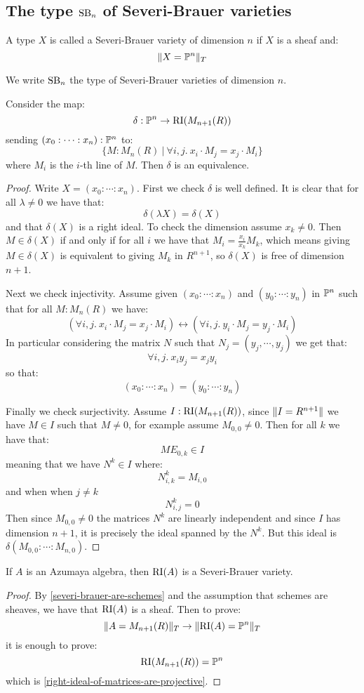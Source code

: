 \subsection{The type $\mathrm{SB}_n$ of Severi-Brauer varieties}

\begin{definition}
A type $X$ is called a Severi-Brauer variety of dimension $n$ if $X$ is a sheaf and:
\[\lVert X=\mathbb{P}^n \rVert_T\]
\end{definition}

We write $\mathrm{SB}_n$ the type of Severi-Brauer varieties of dimension $n$.

\begin{lemma}\label{right-ideal-of-matrices-are-projective}
Consider the map:
\[\delta:\mathbb{P}^n \to \mathrm{RI}(M_{n+1}(R))\]
sending $(x_0:\cdots:x_n):\mathbb{P}^n$ to:
\[\{M:M_n(R)\ |\ \forall i,j.\ x_i\cdot M_j = x_j\cdot M_i\}\]
where $M_i$ is the $i$-th line of $M$. Then $\delta$ is an equivalence.
\end{lemma}

\begin{proof}
Write $X=(x_0:\cdots:x_n)$. First we check $\delta$ is well defined. It is clear that for all $\lambda\not=0$ we have that:
\[\delta(\lambda X) = \delta(X)\]
and that $\delta(X)$ is a right ideal. To check the dimension assume $x_k\not=0$. Then $M\in\delta(X)$ if and only if for all $i$ we have that $M_i = \frac{x_i}{x_k} M_k$, which means giving $M\in\delta(X)$ is equivalent to giving $M_k$ in $R^{n+1}$, so $\delta(X)$ is free of dimension $n+1$.

Next we check injectivity. Assume given $(x_0:\cdots:x_n)$ and $(y_0:\cdots:y_n)$ in $\mathbb{P}^n$ such that for all $M:M_n(R)$ we have:
\[(\forall i,j.\ x_i\cdot M_j = x_j\cdot M_i) \leftrightarrow (\forall i,j.\ y_i\cdot M_j = y_j\cdot M_i)\]
In particular considering the matrix $N$ such that $N_j = (y_j,\cdots,y_j)$ we get that:
\[\forall i,j.\ x_iy_j=x_jy_i\] 
so that:
\[(x_0:\cdots:x_n) = (y_0:\cdots:y_n)\]

Finally we check surjectivity. Assume $I:\mathrm{RI}(M_{n+1}(R))$, since $\lVert I=R^{n+1} \rVert$ we have $M\in I$ such that $M\not=0$, for example assume $M_{0,0}\not=0$. Then for all $k$ we have that:
\[ME_{0,k}\in I\]
meaning that we have $N^k\in I$ where:
\[N^k_{i,k} = M_{i,0}\]
and when when $j\not=k$
\[N^k_{i,j} = 0\]
Then since $M_{0,0}\not=0$ the matrices $N^k$ are linearly independent and since $I$ has dimension $n+1$, it is precisely the ideal spanned by the $N^k$. But this ideal is $\delta(M_{0,0}:\cdots:M_{n,0})$.
\end{proof}

\begin{lemma}
If $A$ is an Azumaya algebra, then $\mathrm{RI}(A)$ is a Severi-Brauer variety.
\end{lemma}

\begin{proof}
By \cref{severi-brauer-are-schemes} and the assumption that schemes are sheaves, we have that $\mathrm{RI}(A)$ is a sheaf. Then to prove:
\[\lVert A=M_{n+1}(R) \rVert_T \to \lVert \mathrm{RI}(A)=\mathbb{P}^n \rVert_T\]
it is enough to prove:
\[\mathrm{RI}(M_{n+1}(R)) = \mathbb{P}^n\]
which is \cref{right-ideal-of-matrices-are-projective}.
\end{proof}